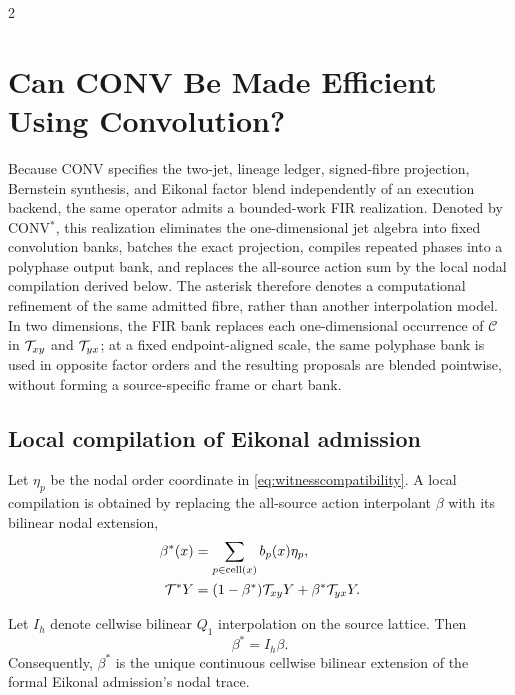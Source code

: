 \onecolumn
\begin{multicols}{2}
\section{Can CONV Be Made Efficient Using Convolution?}
\label{sec:convstar}

Because CONV specifies the two-jet, lineage ledger, signed-fibre projection,
Bernstein synthesis, and Eikonal factor blend independently of an execution
backend, the same operator admits a bounded-work FIR realization. Denoted by
CONV$^{*}$, this realization eliminates the one-dimensional jet algebra into
fixed convolution banks, batches the exact projection, compiles repeated
phases into a polyphase output bank, and replaces the all-source action sum by
the local nodal compilation derived below. The asterisk therefore denotes a
computational refinement of the same admitted fibre, rather than another
interpolation model. In two dimensions, the FIR bank replaces each
one-dimensional occurrence of \(\mathcal C\) in \(\mathcal{T}_{xy}\) and
\(\mathcal{T}_{yx}\); at a fixed endpoint-aligned scale, the same polyphase bank is
used in opposite factor orders and the resulting proposals are blended
pointwise, without forming a source-specific frame or chart bank.

\subsection{Local compilation of Eikonal admission}

Let \(\eta_p\) be the nodal order coordinate in
\eqref{eq:witnesscompatibility}. A local compilation is obtained by replacing
the all-source action interpolant \(\beta\) with its bilinear nodal extension,
\begin{align}
 \beta^*(x)&=\sum_{p\in\operatorname{cell}(x)}b_p(x)\eta_p,\nonumber\\
 \mathcal{T}^*Y&=(1-\beta^*)\mathcal{T}_{xy}Y+\beta^*\mathcal{T}_{yx}Y.
 \label{eq:starlocaladmission}
\end{align}
\begin{proposition}
Let \(I_h\) denote cellwise bilinear \(Q_1\) interpolation on the source
lattice. Then
\begin{equation}
 \boxed{\beta^*=I_h\beta.}
 \label{eq:starcardinalcompilation}
\end{equation}
Consequently, \(\beta^*\) is the unique continuous cellwise bilinear extension
of the formal Eikonal admission's nodal trace.
\end{proposition}


\end{multicols}

